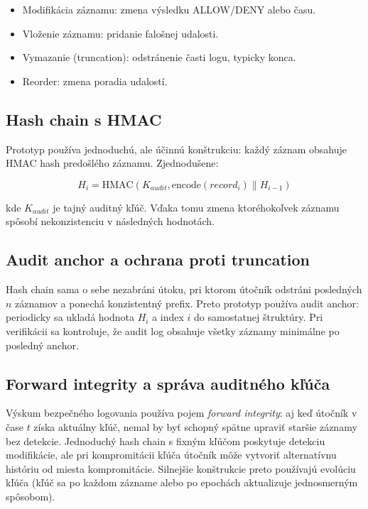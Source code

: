 \documentclass[journal,a4paper,onecolumn]{IEEEtran}
\begin{document}
\begin{itemize}[leftmargin=*,itemsep=2pt]
  \item Modifikácia záznamu: zmena výsledku ALLOW/DENY alebo času.
  \item Vloženie záznamu: pridanie falošnej udalosti.
  \item Vymazanie (truncation): odstránenie časti logu, typicky konca.
  \item Reorder: zmena poradia udalostí.
\end{itemize}

\subsection{Hash chain s HMAC}

Prototyp používa jednoduchú, ale účinnú konštrukciu: každý záznam obsahuje HMAC hash predošlého záznamu. Zjednodušene:

\begin{equation}
H_i = \mathrm{HMAC}(K_{audit}, \mathrm{encode}(record_i) \parallel H_{i-1})
\end{equation}

kde \(K_{audit}\) je tajný auditný kľúč. Vďaka tomu zmena ktoréhokoľvek záznamu spôsobí nekonzistenciu v následných hodnotách.

\subsection{Audit anchor a ochrana proti truncation}

Hash chain sama o sebe nezabráni útoku, pri ktorom útočník odstráni posledných \(n\) záznamov a ponechá konzistentný prefix. Preto prototyp používa audit anchor: periodicky sa ukladá hodnota \(H_i\) a index \(i\) do samostatnej štruktúry. Pri verifikácii sa kontroluje, že audit log obsahuje všetky záznamy minimálne po posledný anchor.

\subsection{Forward integrity a správa auditného kľúča}

Výskum bezpečného logovania používa pojem \emph{forward integrity}: aj keď útočník v čase $t$ získa aktuálny kľúč, nemal by byť schopný spätne upraviť staršie záznamy bez detekcie. Jednoduchý hash chain s fixným kľúčom poskytuje detekciu modifikácie, ale pri kompromitácii kľúča útočník môže vytvoriť alternatívnu históriu od miesta kompromitácie. Silnejšie konštrukcie preto používajú evolúciu kľúča (kľúč sa po každom zázname alebo po epochách aktualizuje jednosmerným spôsobom).\cite{SchneierKelsey1999}
\end{document}
